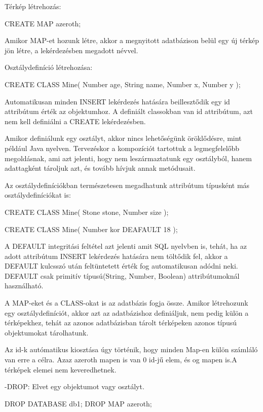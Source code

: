 \begin{sql}
Térkép létrehozás:
\begin{sql}
CREATE MAP azeroth;
\end{sql}
Amikor MAP-et hozunk létre, akkor a megnyitott adatbázison belül egy új térkép jön létre, a lekérdezésben megadott névvel.

Osztálydefiníció létrehozása:
\begin{sql}
CREATE CLASS Mine(
	Number age,
	String name,
	Number x,
	Number y
); 
\end{sql}

Automatikusan minden INSERT lekérdezés hatására beillesztődik egy id attribútum érték az objektumhoz. A definiált classokban van id attribútum, azt nem kell definiálni a CREATE lekérdezésben.

Amikor definiálunk egy osztályt, akkor nincs lehetőségünk öröklődésre, mint például Java nyelven. Tervezéskor a kompozíciót tartottuk a legmegfelelőbb megoldásnak, ami azt jelenti, hogy nem leszármaztatunk egy osztályból, hanem adattagként tároljuk azt, és tovább hívjuk annak metódusait.

Az osztálydefiníciókban természetesen megadhatunk attribútum típusként más osztálydefiníciókat is:

\begin{sql}
CREATE CLASS Mine(
	Stone stone,
	Number size
);

CREATE CLASS Mine(
	Number kor DEAFAULT 18
);
\end{sql}

A DEFAULT integritási feltétel azt jelenti amit SQL nyelvben is, tehát, ha az adott attribútum INSERT lekérdezés hatására nem töltődik fel, akkor a DEFAULT kulcsszó után feltüntetett érték fog automatikusan adódni neki. DEFAULT csak primitív típusú(String, Number, Boolean) attribútumoknál használható.


A MAP-eket és a CLASS-okat is az adatbázis fogja össze.
Amikor létrehozunk egy osztálydefiníciót, akkor azt az adatbázishoz definiáljuk, nem pedig külön a térképekhez, tehát az azonos adatbázisban tárolt térképeken azonos típusú objektumokat tárolhatunk.


Az id-k autómatikus kiosztása úgy történik, hogy minden Map-en külön számláló van erre a célra. Azaz azeroth mapen is van 0 id-jű elem, és og mapen is.A térképek elemei nem keveredhetnek.



-DROP: Elvet egy objektumot vagy osztályt.

\begin{sql}
DROP DATABASE db1;
DROP MAP azeroth;
\end{sql}


\end{sql}
